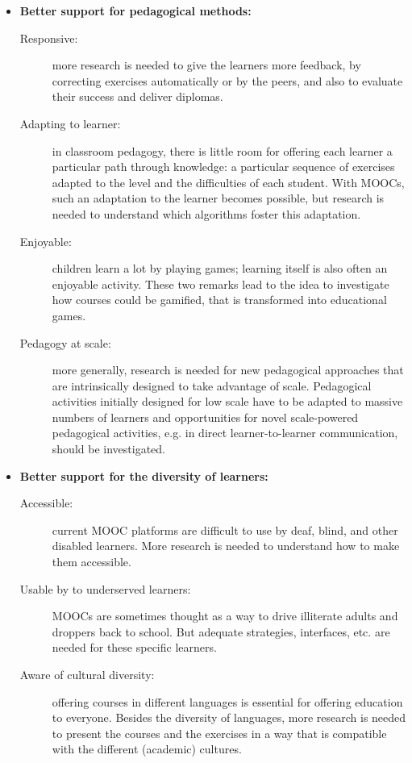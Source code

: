 \begin{itemize}
\item \textbf{Better support for pedagogical methods:}
\begin{description}
\item[Responsive:] more research is needed to give the learners more feedback, by correcting exercises automatically or by the peers, and also to evaluate their success and deliver diplomas. 
\item[Adapting to learner:] in classroom pedagogy, there is little room for offering each learner a particular path through knowledge: a particular sequence of exercises adapted to the level and the difficulties of each student. With MOOCs, such an adaptation to the learner becomes possible, but research is needed to understand which algorithms foster this adaptation.
\item[Enjoyable:] children learn a lot by playing games; learning itself is also often an enjoyable activity. These two remarks lead to the idea to investigate how courses could be gamified, that is transformed into educational games.
\item[Pedagogy at scale:] more generally, research is needed for new pedagogical approaches that are intrinsically designed to take advantage of scale.
Pedagogical activities initially designed for low scale have to be adapted to massive numbers of learners and  opportunities for novel scale-powered pedagogical activities, e.g. in direct learner-to-learner communication, should be investigated.
\end{description}
\item \textbf{Better support for the diversity of learners:}
\begin{description}
\item[Accessible:] current MOOC platforms are difficult to use by deaf, blind, and other disabled learners. More research is needed to understand how to make them accessible.
\item[Usable by to underserved learners:] MOOCs are sometimes thought as a way to drive illiterate adults and droppers back to school. But adequate strategies, interfaces, etc. are needed for these specific learners.
\item[Aware of cultural diversity:] offering courses in different languages is essential for offering education to everyone. Besides the diversity of languages, more research is needed to present the courses and the exercises in a way that is compatible with the different (academic) cultures.


\end{description}
\end{itemize}


